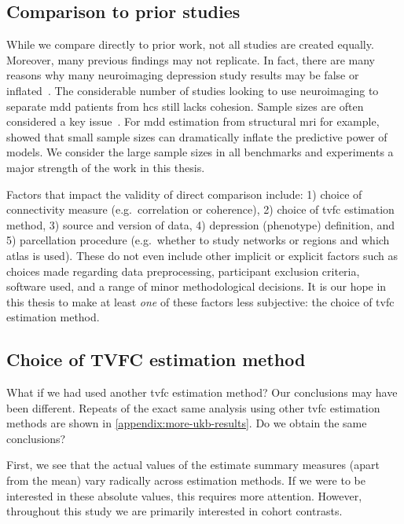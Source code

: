 \subsection{Comparison to prior studies}

While we compare directly to prior work, not all studies are created equally.
Moreover, many previous findings may not replicate.
In fact, there are many reasons why many neuroimaging depression study results may be false or inflated~\parencite{Flint2021}.
The considerable number of studies looking to use neuroimaging to separate \gls{mdd} patients from \glspl{hc} still lacks cohesion.
Sample sizes are often considered a key issue~\parencite{Varoquaux2018, Szucs2020, Libedinsky2022, Marek2022}.
For \gls{mdd} estimation from structural \gls{mri} for example, \textcite{Flint2021} showed that small sample sizes can dramatically inflate the predictive power of models.
We consider the large sample sizes in all benchmarks and experiments a major strength of the work in this thesis.

Factors that impact the validity of direct comparison include: 1) choice of connectivity measure (e.g.~correlation or coherence), 2) choice of \gls{tvfc} estimation method, 3) source and version of data, 4) depression (phenotype) definition, and 5) parcellation procedure (e.g.~whether to study networks or regions and which atlas is used).
These do not even include other implicit or explicit factors such as choices made regarding data preprocessing, participant exclusion criteria, software used, and a range of minor methodological decisions.
It is our hope in this thesis to make at least \emph{one} of these factors less subjective: the choice of \gls{tvfc} estimation method.

\subsection{Choice of TVFC estimation method}

What if we had used another \gls{tvfc} estimation method?
Our conclusions may have been different.
Repeats of the exact same analysis using other \gls{tvfc} estimation methods are shown in \cref{appendix:more-ukb-results}.
Do we obtain the same conclusions?

First, we see that the actual values of the estimate summary measures (apart from the mean) vary radically across estimation methods.
If we were to be interested in these absolute values, this requires more attention.
However, throughout this study we are primarily interested in cohort contrasts.

